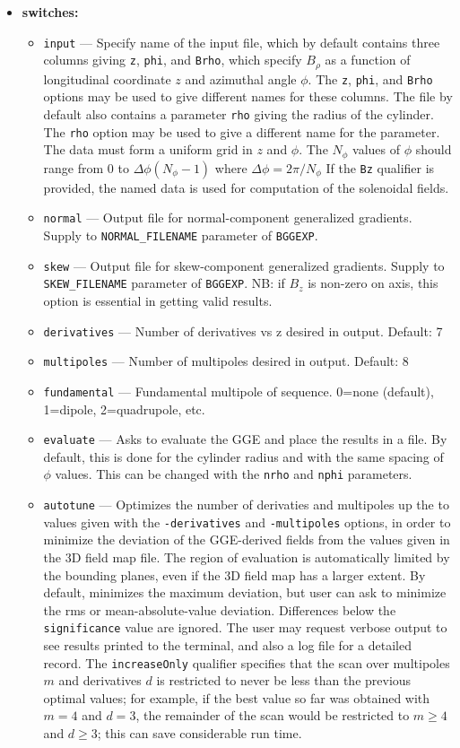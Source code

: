 \documentclass[11pt]{article}
\begin{document}
\begin{itemize}
\item {\bf switches:}
\begin{itemize}
\item {\tt input} --- Specify name of the input file, which by default contains three columns giving \verb|z|, \verb|phi|, and
  \verb|Brho|, which specify $B_\rho$ as a function of longitudinal coordinate $z$ and azimuthal angle $\phi$.  The \verb|z|,
  \verb|phi|, and \verb|Brho| options may be used to give different names for these columns.  The file by default also
  contains a parameter \verb|rho| giving the radius of the cylinder. The \verb|rho| option may be used to give a
  different name for the parameter.  The data must form a uniform grid in $z$ and $\phi$. The $N_\phi$ values of $\phi$
  should range from $0$ to $\Delta \phi (N_\phi-1)$ where $\Delta \phi = 2\pi/N_\phi$
  If the \verb|Bz| qualifier is provided, the named data is used for computation of the solenoidal fields.
\item {\tt normal} ---  Output file for normal-component generalized gradients. Supply to \verb|NORMAL_FILENAME|
  parameter of \verb|BGGEXP|.
\item {\tt skew} ---  Output file for skew-component generalized gradients. Supply to \verb|SKEW_FILENAME|
  parameter of \verb|BGGEXP|.
  NB: if $B_z$ is non-zero on axis, this option is essential in getting valid results.
\item {\tt derivatives} --- Number of derivatives vs z desired in output. Default: 7
\item {\tt multipoles} ---  Number of multipoles desired in output. Default: 8
\item {\tt fundamental} --- Fundamental multipole of sequence. 0=none (default), 1=dipole, 2=quadrupole, etc.
\item {\tt evaluate} --- Asks to evaluate the GGE and place the results in a file. By default, this is done
  for the cylinder radius and with the same spacing of $\phi$ values. This can be changed with the \verb|nrho|
  and \verb|nphi| parameters.
\item {\tt autotune} --- Optimizes the number of derivaties and multipoles up the to values given with the
  \verb|-derivatives| and \verb|-multipoles| options, in order to minimize the deviation of the GGE-derived
  fields from the values given in the 3D field map file. The region of evaluation is automatically limited by
  the bounding planes, even if the 3D field map has a larger extent. By default, minimizes the maximum deviation, but user can
  ask to minimize the rms or mean-absolute-value deviation. Differences below the \verb|significance| value are
  ignored. The user may request verbose output to see results printed to the terminal, and also a log file
  for a detailed record.
  The \verb|increaseOnly| qualifier specifies that the scan over multipoles $m$ and derivatives $d$
  is restricted to never be less than the previous optimal values; for example, if the best value
  so far was obtained with $m=4$ and $d=3$, the remainder of the scan would be restricted to $m\ge 4$ and $d\ge 3$;
  this can save considerable run time.
\end{itemize}


\end{itemize}
\end{document}
